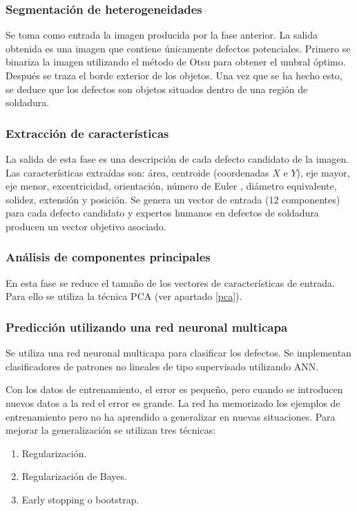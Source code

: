 \subsubsection{Segmentación de heterogeneidades}
Se toma como entrada la imagen producida por la fase anterior. 
La salida obtenida es una imagen que contiene únicamente defectos potenciales.
Primero se binariza la imagen utilizando el método de Otsu para obtener el umbral óptimo. Después se traza el borde exterior de los objetos. Una vez que se ha hecho esto, se deduce que los defectos son objetos situados dentro de una región de soldadura.


\subsubsection{Extracción de características}
La salida de esta fase es una descripción de cada defecto candidato de la imagen. Las características extraídas son: área, centroide (coordenadas $X$ e $Y$), eje mayor, eje menor, excentricidad, orientación, número de Euler \cite{dunham1999euler}, diámetro equivalente, solidez, extensión y posición. Se genera un vector de entrada (12 componentes) para cada defecto candidato y expertos humanos en defectos de soldadura producen un vector objetivo asociado.


\subsubsection{Análisis de componentes principales}
En esta fase se reduce el tamaño de los vectores de características de entrada. Para ello se utiliza la técnica PCA \cite{PCA} (ver apartado \ref{pca}).


\subsubsection{Predicción utilizando una red neuronal multicapa}
Se utiliza una red neuronal multicapa para clasificar los defectos.
Se implementan clasificadores de patrones no lineales de tipo supervisado utilizando ANN.

Con los datos de entrenamiento, el error es pequeño, pero cuando se introducen nuevos datos a la red el error es grande. La red ha memorizado los ejemplos de entrenamiento pero no ha aprendido a generalizar en nuevas situaciones. Para mejorar la generalización se utilizan tres técnicas:
	\begin{enumerate}
	\item Regularización.
	\item Regularización de Bayes.
	\item Early stopping o bootstrap.
	\end{enumerate}

